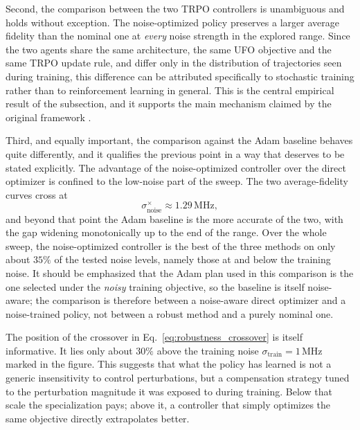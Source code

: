 Second, the comparison between the two TRPO controllers is unambiguous and holds without exception. The
noise-optimized policy preserves a larger average fidelity than the nominal one at \emph{every} noise strength in
the explored range. Since the two agents share the same architecture, the same UFO objective and the same TRPO
update rule, and differ only in the distribution of trajectories seen during training, this difference can be
attributed specifically to stochastic training rather than to reinforcement learning in general. This is the
central empirical result of the subsection, and it supports the main mechanism claimed by the original framework
\cite{Niu2019}.

Third, and equally important, the comparison against the Adam baseline behaves quite differently, and it
qualifies the previous point in a way that deserves to be stated explicitly. The advantage of the noise-optimized
controller over the direct optimizer is confined to the low-noise part of the sweep. The two average-fidelity
curves cross at
\begin{equation}
\sigma_{\mathrm{noise}}^{\times} \approx 1.29\,\mathrm{MHz},
\label{eq:robustness_crossover}
\end{equation}
and beyond that point the Adam baseline is the more accurate of the two, with the gap widening monotonically up
to the end of the range. Over the whole sweep, the noise-optimized controller is the best of the three methods on
only about $35\%$ of the tested noise levels, namely those at and below the training noise. It should be
emphasized that the Adam plan used in this comparison is the one selected under the \emph{noisy} training
objective, so the baseline is itself noise-aware; the comparison is therefore between a noise-aware direct
optimizer and a noise-trained policy, not between a robust method and a purely nominal one.

The position of the crossover in Eq.~\eqref{eq:robustness_crossover} is itself informative. It lies only about
$30\%$ above the training noise $\sigma_{\mathrm{train}}=1\,\mathrm{MHz}$ marked in the figure. This suggests that
what the policy has learned is not a generic insensitivity to control perturbations, but a compensation strategy
tuned to the perturbation magnitude it was exposed to during training. Below that scale the specialization pays;
above it, a controller that simply optimizes the same objective directly extrapolates better.

